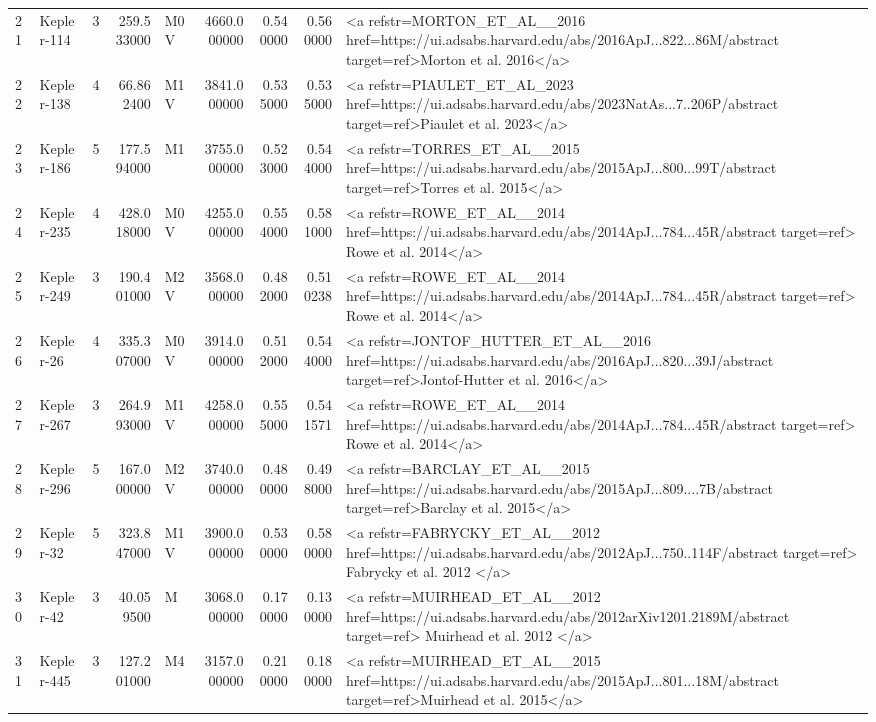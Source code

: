 \begin{tabular}{llrrlrrrl}
21 & Kepler-114 & 3 & 259.533000 & M0 V & 4660.000000 & 0.540000 & 0.560000 & <a refstr=MORTON_ET_AL__2016 href=https://ui.adsabs.harvard.edu/abs/2016ApJ...822...86M/abstract target=ref>Morton et al. 2016</a> \\
22 & Kepler-138 & 4 & 66.862400 & M1 V & 3841.000000 & 0.535000 & 0.535000 & <a refstr=PIAULET_ET_AL_2023 href=https://ui.adsabs.harvard.edu/abs/2023NatAs...7..206P/abstract target=ref>Piaulet et al. 2023</a> \\
23 & Kepler-186 & 5 & 177.594000 & M1 & 3755.000000 & 0.523000 & 0.544000 & <a refstr=TORRES_ET_AL__2015 href=https://ui.adsabs.harvard.edu/abs/2015ApJ...800...99T/abstract target=ref>Torres et al. 2015</a> \\
24 & Kepler-235 & 4 & 428.018000 & M0 V & 4255.000000 & 0.554000 & 0.581000 & <a refstr=ROWE_ET_AL__2014 href=https://ui.adsabs.harvard.edu/abs/2014ApJ...784...45R/abstract target=ref> Rowe et al. 2014</a> \\
25 & Kepler-249 & 3 & 190.401000 & M2 V & 3568.000000 & 0.482000 & 0.510238 & <a refstr=ROWE_ET_AL__2014 href=https://ui.adsabs.harvard.edu/abs/2014ApJ...784...45R/abstract target=ref> Rowe et al. 2014</a> \\
26 & Kepler-26 & 4 & 335.307000 & M0 V & 3914.000000 & 0.512000 & 0.544000 & <a refstr=JONTOF_HUTTER_ET_AL__2016 href=https://ui.adsabs.harvard.edu/abs/2016ApJ...820...39J/abstract target=ref>Jontof-Hutter et al. 2016</a> \\
27 & Kepler-267 & 3 & 264.993000 & M1 V & 4258.000000 & 0.555000 & 0.541571 & <a refstr=ROWE_ET_AL__2014 href=https://ui.adsabs.harvard.edu/abs/2014ApJ...784...45R/abstract target=ref> Rowe et al. 2014</a> \\
28 & Kepler-296 & 5 & 167.000000 & M2 V & 3740.000000 & 0.480000 & 0.498000 & <a refstr=BARCLAY_ET_AL__2015 href=https://ui.adsabs.harvard.edu/abs/2015ApJ...809....7B/abstract target=ref>Barclay et al. 2015</a> \\
29 & Kepler-32 & 5 & 323.847000 & M1 V & 3900.000000 & 0.530000 & 0.580000 & <a refstr=FABRYCKY_ET_AL__2012 href=https://ui.adsabs.harvard.edu/abs/2012ApJ...750..114F/abstract target=ref> Fabrycky et al. 2012 </a> \\
30 & Kepler-42 & 3 & 40.059500 & M & 3068.000000 & 0.170000 & 0.130000 & <a refstr=MUIRHEAD_ET_AL__2012 href=https://ui.adsabs.harvard.edu/abs/2012arXiv1201.2189M/abstract target=ref> Muirhead et al. 2012 </a> \\
31 & Kepler-445 & 3 & 127.201000 & M4 & 3157.000000 & 0.210000 & 0.180000 & <a refstr=MUIRHEAD_ET_AL__2015 href=https://ui.adsabs.harvard.edu/abs/2015ApJ...801...18M/abstract target=ref>Muirhead et al. 2015</a> \\

\end{tabular}
